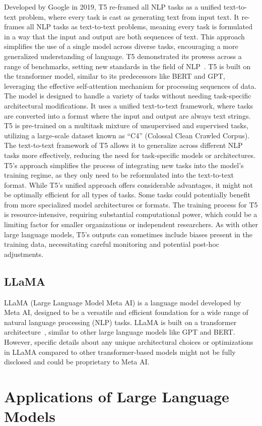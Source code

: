 Developed by Google in 2019, T5 re-framed all NLP tasks as a unified text-to-text problem, where every task is cast as generating text from input text.
It re-frames all NLP tasks as text-to-text problems, meaning every task is formulated in a way that the input and output are both sequences of text.
This approach simplifies the use of a single model across diverse tasks, encouraging a more generalized understanding of language.
T5 demonstrated its prowess across a range of benchmarks, setting new standards in the field of NLP~\cite{t5}.
T5 is built on the transformer model, similar to its predecessors like BERT and GPT, leveraging the effective self-attention mechanism for processing sequences of data.
The model is designed to handle a variety of tasks without needing task-specific architectural modifications.
It uses a unified text-to-text framework, where tasks are converted into a format where the input and output are always text strings.
T5 is pre-trained on a multitask mixture of unsupervised and supervised tasks, utilizing a large-scale dataset known as \enquote{C4} (Colossal Clean Crawled Corpus).
The text-to-text framework of T5 allows it to generalize across different NLP tasks more effectively, reducing the need for task-specific models or architectures.
T5's approach simplifies the process of integrating new tasks into the model's training regime, as they only need to be reformulated into the text-to-text format.
While T5's unified approach offers considerable advantages, it might not be optimally efficient for all types of tasks.
Some tasks could potentially benefit from more specialized model architectures or formats.
The training process for T5 is resource-intensive, requiring substantial computational power, which could be a limiting factor for smaller organizations or independent researchers.
As with other large language models, T5's outputs can sometimes include biases present in the training data, necessitating careful monitoring and potential post-hoc adjustments.

\subsection{LLaMA}
\label{subsec:llama}

LLaMA (Large Language Model Meta AI) is a language model developed by Meta AI, designed to be a versatile and efficient foundation for a wide range of natural language processing (NLP) tasks.
LLaMA is built on a transformer architecture~\cite{vaswani2023attention}, similar to other large language models like GPT and BERT. However, specific details about any unique architectural choices or optimizations in LLaMA compared to other transformer-based models might not be fully disclosed and could be proprietary to Meta AI\@.


\section{Applications of Large Language Models}
\label{sec:applications-of-large-language-models}
